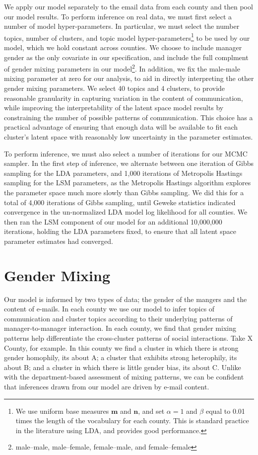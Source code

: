 \documentclass{pnastwo}
\begin{document}
\begin{article}
We apply our model separately to the email data from each county and then pool our model results. To perform inference on real data, we must first select a number of model hyper-parameters. In particular, we must select the number topics, number of clusters, and topic model hyper-parameters\footnote{We use uniform base measures $\mathbf{m}$ and $\mathbf{n}$, and set $\alpha = 1$ and $\beta$ equal to 0.01 times the length of the vocabulary for each county. This is standard practice in the literature using LDA, and provides good performance.} to be used by our model, which we hold constant across counties. We choose to include manager gender as the only covariate in our specification, and include the full complment of gender mixing parameters in our model\footnote{male--male, male--female, female--male, and female--female}. In addition, we fix the male-male mixing parameter at zero for our analysis, to aid in directly interpreting the other gender mixing parameters. We select 40 topics and 4 clusters, to provide reasonable granularity in capturing variation in the content of communication, while improving the interpretability of the latent space model results by constraining the number of possible patterns of communication. This choice has a practical advantage of ensuring that enough data will be available to fit each cluster’s latent space with reasonably low uncertainty in the parameter estimates.

To perform inference, we must also select a number of iterations for our MCMC sampler. In the first step of inference, we alternate between one iteration of Gibbs sampling for the LDA parameters, and 1,000 iterations of Metropolis Hastings sampling for the LSM parameters, as the Metropolis Hastings algorithm explores the parameter space much more slowly than Gibbs sampling. We did this for a total of 4,000 iterations of Gibbs sampling, until Geweke statistics indicated convergence in the un-normalized LDA model log likelihood for all counties. We then ran the LSM component of our model for an additional 10,000,000 iterations, holding the LDA parameters fixed, to ensure that all latent space parameter estimates had converged.


\section{Gender Mixing}

Our model is informed by two types of data; the gender of the mangers and the content of e-mails. In each county we use our model to infer topics of communication and cluster topics according to their underlying patterns of manager-to-manager interaction. In each county, we find that gender mixing patterns help differentiate the cross-cluster patterns of social interactions. Take X County, for example. In this county we find a cluster in which there is strong gender homophily, its about A; a cluster that exhibits strong heterophily, its about B; and a cluster in which there is little gender bias, its about C. Unlike with the department-based assessment of mixing patterns, we can be confident that inferences drawn from our model are driven by e-mail content.
	

\end{article}
\end{document}
